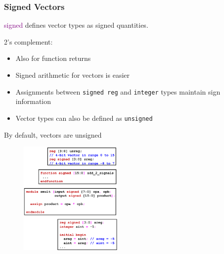 \documentclass[t, notes, xcolor=table]{beamer}
\begin{document}
\begin{frame}[fragile]
\frametitle{Signed Vectors}

\begin{multicols}{2}
\scriptsize{
\textcolor{purple}{signed} defines vector types as signed quantities.
\newline

2's complement:
\begin{itemize}
\item Also for function returns
\item Signed arithmetic for vectors is easier
\item Assignments between \verb+signed reg+ and \verb+integer+ types maintain sign information
\item Vector types can also be defined as \verb+unsigned+
\end{itemize}
By default, vectors are unsigned
\vfill
\columnbreak

\begin{figure}
    \includegraphics[width=0.45\textwidth]{img/05_signed.png}
\end{figure}
}
\end{multicols}
\end{frame}
\end{document}
